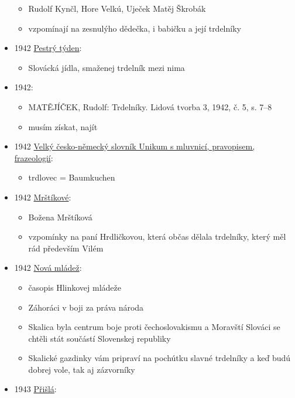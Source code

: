 \begin{itemize}
  \begin{itemize}
  \tightlist
  \item
    Rudolf Kynčl, Hore Velkú, Uječek Matěj Škrobák
  \item
    vzpomínají na zesnulýho dědečka, i babičku a její trdelníky
  \end{itemize}
\item
  1942
  \href{https://ceskadigitalniknihovna.cz/view/uuid:b2ec6826-435d-11dd-b505-00145e5790ea?page=uuid\%3A5f028ec9-435f-11dd-b505-00145e5790ea&fulltext=trdeln\%C3\%ADk\%20OR\%20trdeln\%C3\%ADky\%20OR\%20trdeln\%C3\%ADk\%C5\%AF&source=mzk}{Pestrý
  týden}:

  \begin{itemize}
  \tightlist
  \item
    Slovácká jídla, smaženej trdelník mezi nima
  \end{itemize}
\item
  1942:

  \begin{itemize}
  \tightlist
  \item
    MATĚJÍČEK, Rudolf: Trdelníky. Lidová tvorba 3, 1942, č. 5, s. 7--8
  \item
    musím získat, najít
  \end{itemize}
\item
  1942
  \href{https://ceskadigitalniknihovna.cz/uuid/uuid:086b8270-e420-11e8-a5a4-005056827e52}{Velký
  česko-německý slovník Unikum s mluvnicí, pravopisem, frazeologií}:

  \begin{itemize}
  \tightlist
  \item
    trdlovec = Baumkuchen
  \end{itemize}
\item
  1942
  \href{https://ceskadigitalniknihovna.cz/uuid/uuid:2c588580-119c-11e9-a03f-5ef3fc9bb22f}{Mrštíkové}:

  \begin{itemize}
  \tightlist
  \item
    Božena Mrštíková
  \item
    vzpomínky na paní Hrdličkovou, která občas dělala trdelníky, který
    měl rád především Vilém
  \end{itemize}
\item
  1942
  \href{https://dikda.snk.sk/uuid/uuid:1d7f9dc9-2139-4760-83d7-7d58e659a26a}{Nová
  mládež}:

  \begin{itemize}
  \tightlist
  \item
    časopis Hlinkovej mládeže
  \item
    Záhoráci v boji za práva národa
  \item
    Skalica byla centrum boje proti čechoslovakismu a Moravští Slováci
    se chtěli stát součástí Slovenskej republiky
  \item
    Skalické gazdinky vám pripraví na pochútku slavné trdelníky a keď
    budú dobrej vole, tak aj zázvorníky
  \end{itemize}
\item
  1943
  \href{https://ceskadigitalniknihovna.cz/uuid/uuid:dc1db170-6fe9-11ed-a5ba-005056827e51}{Přišlá}:


\end{itemize}
